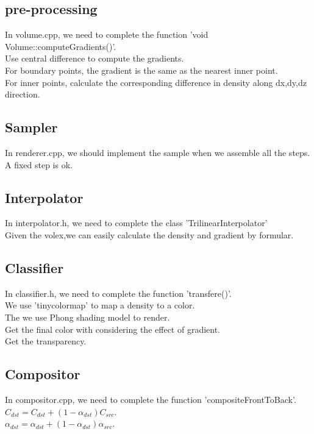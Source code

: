 \documentclass[acmtog]{acmart}
\begin{document}
\subsection{pre-processing}
In volume.cpp, we need to complete the function 'void Volume::computeGradients()'.
\\Use central difference to compute the gradients.
\\For boundary points, the gradient is the same as the nearest inner point.
\\For inner points, calculate the corresponding difference in density along dx,dy,dz direction.

\vspace*{1 ex}
\subsection{Sampler}
In renderer.cpp, we should implement the sample when we assemble all the steps.
\\A fixed step is ok.

\subsection{Interpolator}
In interpolator.h, we need to complete the class 'TrilinearInterpolator'
\\Given the volex,we can easily calculate the density and gradient by formular.

\subsection{Classifier}
In classifier.h, we need to complete the function 'transfere()'.
\\We use 'tinycolormap' to map a density to a color.
\\The we use Phong shading model to render.
\\Get the final color with considering the effect of gradient.
\\Get the transparency.

\subsection{Compositor}
In compositor.cpp, we need to complete the function 'compositeFrontToBack'.
\\$C_{dst} = C_{dst} + (1-\alpha_{dst})C_{src}$.
\\$\alpha_{dst} = \alpha_{dst} + (1-\alpha_{dst})\alpha_{src}$.
\end{document}
